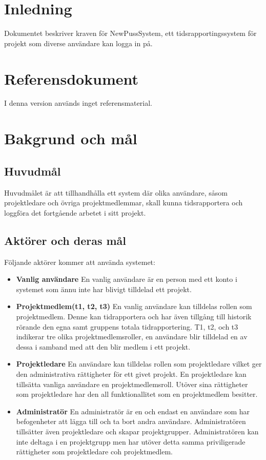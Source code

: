 \documentclass[a4paper]{article}
\begin{document}
\section{Inledning}       
Dokumentet beskriver kraven för NewPussSystem, ett tidsrapportingssystem för projekt som diverse användare kan logga in på.

\section{Referensdokument}
I denna version används inget referensmaterial.
\section{Bakgrund och mål}   
\subsection{Huvudmål}
Huvudmålet är att tillhandhålla ett system där olika användare, såsom projektledare och övriga projektmedlemmar, skall kunna tidsrapportera och loggföra det fortgående arbetet i sitt projekt. 

\subsection{Aktörer och deras mål}
\label{bom-aktorer}
Följande aktörer kommer att använda systemet:
\begin{itemize}
\item [] \textbf{Vanlig användare} En vanlig användare är en person med ett konto i systemet som ännu inte har blivigt tilldelad ett projekt.
\item [] \textbf{Projektmedlem(t1, t2, t3)} En vanlig användare kan tilldelas rollen som projektmedlem. Denne kan tidrapportera och har även tillgång till historik rörande den egna samt gruppens totala tidrapportering. T1, t2, och t3 indikerar tre olika projektmedlemsroller, en användare blir tilldelad en av dessa i samband med att den blir medlem i ett projekt.
\item [] \textbf{Projektledare} En användare kan tilldelas rollen som projektledare vilket ger den administrativa rättigheter för ett givet projekt. En projektledare kan tillsätta vanliga användare en projektmedlemsroll. Utöver sina rättigheter som projektledare har den all funktionallitet som en projektmedlem besitter.
\item [] \textbf{Administratör} En administratör är en och endast en användare som har befogenheter att lägga till och ta bort andra användare. Administratören tillsätter även projektledare och skapar projektgrupper. Administratören kan inte deltaga i en projektgrupp men har utöver detta samma priviligerade rättigheter som projektledare coh projektmedlem.
\end{itemize}
\end{document}
